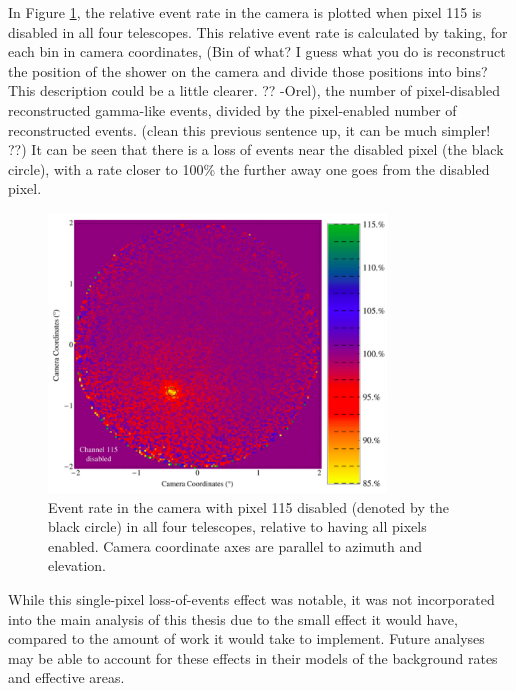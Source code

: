     In Figure \ref{fig:dpix_rel_camera}, the relative event rate in the camera is plotted when pixel 115 is disabled in all four telescopes.
    This relative event rate is calculated by taking, {\color{red}for each bin in camera coordinates,  (Bin of what? I guess what you do is reconstruct the position of the shower on the camera and divide those positions into bins? 
This description could be a little clearer. ?? -Orel)}, the number of pixel-disabled reconstructed gamma-like events, divided by the pixel-enabled number of reconstructed events.
    {\color{red}(clean this previous sentence up, it can be much simpler! ??)}
    It can be seen that there is a loss of events near the disabled pixel (the black circle), with a rate closer to 100\% the further away one goes from the disabled pixel.

    \begin{figure}[ht]
      \centering
      \includegraphics[width=0.8\textwidth]{images/disabled_pixel/relativerate_camera}
      \caption[Relative Event Rate]{
        Event rate in the camera with pixel 115 disabled (denoted by the black circle) in all four telescopes, relative to having all pixels enabled.
        Camera coordinate axes are parallel to azimuth and elevation.
      }
      \label{fig:dpix_rel_camera}
    \end{figure}
    
    While this single-pixel loss-of-events effect was notable, it was not incorporated into the main analysis of this thesis due to the small effect it would have, compared to the amount of work it would take to implement.
    Future analyses may be able to account for these effects in their models of the background rates and effective areas.
    
